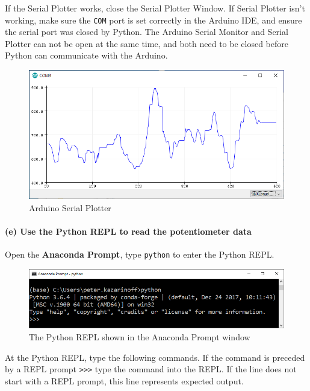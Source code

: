 \documentclass[11pt]{article}
\begin{document}
If the Serial Plotter works, close the Serial Plotter Window. If Serial
Plotter isn't working, make sure the
\texttt{\textquotesingle{}COM\textquotesingle{}} port is set correctly
in the Arduino IDE, and ensure the serial port was closed by Python. The
Arduino Serial Monitor and Serial Plotter can not be open at the same
time, and both need to be closed before Python can communicate with the
Arduino.

\begin{figure}
\centering
\includegraphics{images/serial_plotter_output.png}
\caption{Arduino Serial Plotter}
\end{figure}

    \hypertarget{e-use-the-python-repl-to-read-the-potentiometer-data}{%
\paragraph{(e) Use the Python REPL to read the potentiometer
data}\label{e-use-the-python-repl-to-read-the-potentiometer-data}}

Open the \textbf{Anaconda Prompt}, type \texttt{python} to enter the
Python REPL.

\begin{figure}
\centering
\includegraphics{images/anaconda_prompt_python_REPL.png}
\caption{The Python REPL shown in the Anaconda Prompt window}
\end{figure}

At the Python REPL, type the following commands. If the command is
preceded by a REPL prompt
\texttt{\textgreater{}\textgreater{}\textgreater{}} type the command
into the REPL. If the line does not start with a REPL prompt, this line
represents expected output.
\end{document}
